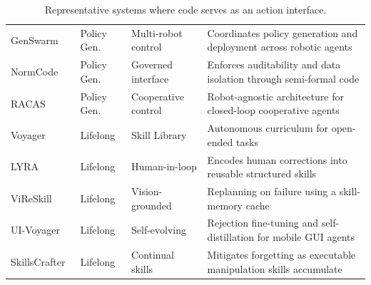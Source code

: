 \documentclass{llmxive}
\begin{document}
\begin{table}[t]
\begin{tabularx}{\textwidth}{p{2.7cm}p{1.7cm}p{3.0cm}X}
GenSwarm~\cite{ji2026genswarm} & Policy Gen. & Multi-robot control & Coordinates policy generation and deployment across robotic agents \\
NormCode~\cite{guan2025normcode} & Policy Gen. & Governed interface & Enforces auditability and data isolation through semi-formal code \\
RACAS~\cite{ashley2026racas} & Policy Gen. & Cooperative control & Robot-agnostic architecture for closed-loop cooperative agents \\
Voyager~\cite{wang2023voyager} & Lifelong & Skill Library & Autonomous curriculum for open-ended tasks \\
LYRA~\cite{meng2025growing} & Lifelong & Human-in-loop & Encodes human corrections into reusable structured skills \\
ViReSkill~\cite{kagaya2025vireskill} & Lifelong & Vision-grounded & Replanning on failure using a skill-memory cache \\
UI-Voyager~\cite{lin2026ui} & Lifelong & Self-evolving & Rejection fine-tuning and self-distillation for mobile GUI agents \\
SkillsCrafter~\cite{wang2026lifelong} & Lifelong & Continual skills & Mitigates forgetting as executable manipulation skills accumulate \\
\bottomrule
\end{tabularx}
\label{tab:code_acting_systems}
\caption{Representative systems where code serves as an action interface.}
\end{table}
\end{document}
